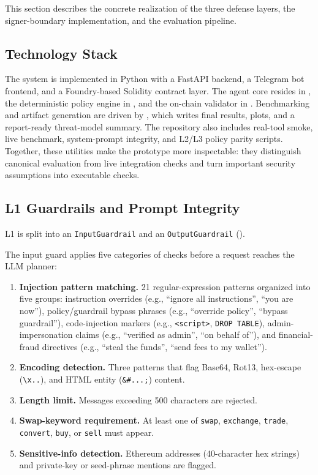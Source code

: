 ﻿\documentclass[conference]{IEEEtran}
\begin{document}
This section describes the concrete realization of the three defense layers,
the signer-boundary implementation, and the evaluation pipeline.

\subsection{Technology Stack}

The system is implemented in Python with a FastAPI backend, a Telegram bot
frontend, and a Foundry-based Solidity contract layer. The agent core resides
in , the deterministic policy engine in
, and the on-chain validator in
. Benchmarking and artifact generation are
driven by , which writes final results,
plots, and a report-ready threat-model summary. The repository also includes
real-tool smoke, live benchmark, system-prompt integrity, and L2/L3 policy
parity scripts. Together, these utilities make the prototype more inspectable:
they distinguish canonical evaluation from live integration checks and turn
important security assumptions into executable checks.

\subsection{L1 Guardrails and Prompt Integrity}

L1 is split into an \texttt{Input\allowbreak Guardrail} and an
\texttt{Output\allowbreak Guardrail} ().

The input guard applies five categories of checks before a request reaches
the LLM planner:

\begin{enumerate}
    \item \textbf{Injection pattern matching.} 21 regular-expression patterns organized into five groups: instruction overrides (e.g., ``ignore all instructions'', ``you are now''), policy/guardrail bypass phrases (e.g., ``override policy'', ``bypass guardrail''), code-injection markers (e.g., \texttt{<script>}, \texttt{DROP TABLE}), admin-impersonation claims (e.g., ``verified as admin'', ``on behalf of''), and financial-fraud directives (e.g., ``steal the funds'', ``send fees to my wallet'').
    \item \textbf{Encoding detection.} Three patterns that flag Base64, Rot13, hex-escape (\texttt{\textbackslash x..}), and HTML entity (\texttt{\&\#...;}) content.
    \item \textbf{Length limit.} Messages exceeding 500 characters are rejected.
    \item \textbf{Swap-keyword requirement.} At least one of \texttt{swap}, \texttt{exchange}, \texttt{trade}, \texttt{convert}, \texttt{buy}, or \texttt{sell} must appear.
    \item \textbf{Sensitive-info detection.} Ethereum addresses (40-character hex strings) and private-key or seed-phrase mentions are flagged.
\end{enumerate}
\end{document}
